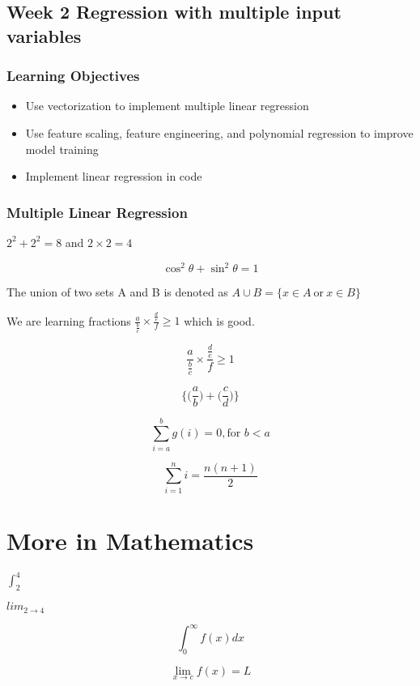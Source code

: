\documentclass{article}
\begin{document}
    \subsection{Week 2 Regression with multiple input variables}
    \subsubsection{Learning Objectives}
    \begin{itemize}
        \item Use vectorization to implement multiple linear regression
        \item Use feature scaling, feature engineering, and polynomial regression to improve model training
        \item Implement linear regression in code
    \end{itemize}
    \subsubsection{Multiple Linear Regression}





    \newpage
    $ 2^{2} + 2^{2} = 8$ and $ 2 \times 2 = 4$

    \[ \cos^2 \theta + \sin^2 \theta = 1\]
    
    The union of two sets A and B is denoted as 
    $ A \cup B = \{ x \in A \ \text{or} \ x \in B \} $
    
    We are learning fractions $ \frac{a}{\frac{b}{c}} \times \frac{\frac{d}{e}}{f} \geq 1$ which is good.

    \[ \frac{a}{\frac{b}{c}} \times \frac{\frac{d}{e}}{f} \geq 1\]

    \[ \Bigg\{ \bigg(\frac{a}{b}\bigg) + \bigg(\frac{c}{d}\bigg)\Bigg\} \]

    \[ \sum_{i=a}^{b} g(i) = 0, \text{for } b < a \]

    \[ \sum_{i=1}^{n} i = \frac{n(n+1)}{2} \]

    \section{More in Mathematics}

    $\int_{2}^{4}$

    $lim_{2 \to 4}$

    \[ \int_{0}^{\infty} f(x)dx \]

    \[ \lim_{x \to c} f(x)=L \]
\end{document}
